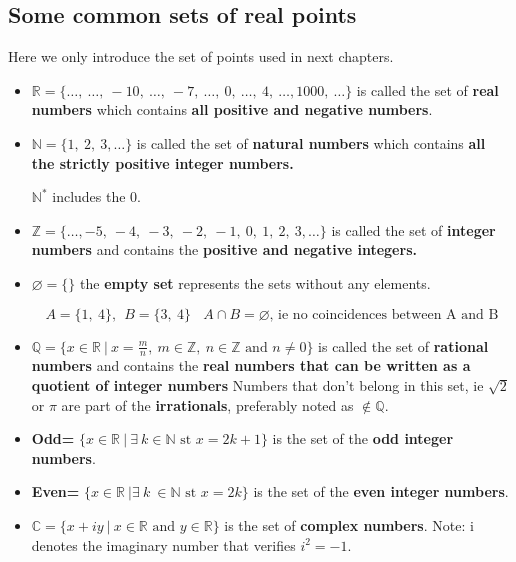 \documentclass[12pt, a4paper]{book}
\begin{document}
\subsection*{Some common sets of real points}
Here we only introduce the set of points used in next chapters.

\begin{defn}
\end{defn}
\boldmath
  \begin{itemize}
    \item $\mathbb{R}=\{ \ldots, \ \ldots, \ -10, \ \ldots, \ -7, \ \ldots, \ 0, \ \ldots, \ 4, \ \ldots, 1000, \ \ldots  \}$ is called the set of \textbf{real numbers} which contains \textbf{all positive and negative numbers}.
    \item $\mathbb{N}= \{1, \ 2 , \ 3 , \ldots \}$ is called the set of \textbf{natural numbers} which contains \textbf{all the strictly positive integer numbers.}
    \begin{rem}
      $\mathbb{N^{*}}$ includes the 0.
    \end{rem}
    \item $\mathbb{Z}= \{\ldots, -5, \ -4, \ -3, \ -2, \ -1, \ 0, \ 1, \ 2, \ 3, \ldots  \}$ is called the set of \textbf{integer numbers} and contains the \textbf{positive and negative integers.}
    \item $\varnothing = \{\}$ the \textbf{empty set} represents the sets without any elements. 
    \begin{exmp}
      \[
        A=\{1, \ 4 \}, \ \ B=\{3, \ 4 \} \ \ \ \ A \cap B= \varnothing \text{, ie no coincidences between A and B}
      \]
    \end{exmp} 
    \item $\mathbb{Q}= \{x \in \mathbb{R} \ \vert \ x= \frac{m}{n}, \ m \in \mathbb{Z}, \ n \in \mathbb{Z} \text{ and } n \neq 0 \}$ is called the set of \textbf{rational numbers} and contains the \textbf{real numbers that can be written as a quotient of integer numbers}
    Numbers that don't belong in this set, ie $\sqrt{2}$ or $\pi$ are part of the \textbf{irrationals}, preferably noted as $\notin \mathbb{Q}$.
    \item \textbf{Odd=} $\{ x \in \mathbb{R} \ \vert \ \exists \ k \in \mathbb{N} \text{ st } x=2k+1 \}$ is the set of the \textbf{odd integer numbers}.
    \item \textbf{Even=} $\{ x \in \mathbb{R} \ \vert \exists \ k \ \in \mathbb{N} \text{ st } x=2k \}$ is the set of the \textbf{even integer numbers}.
    \item $\mathbb{C}= \{x +iy \ \vert \ x \in \mathbb{R} \text{ and } y \in \mathbb{R}  \}$ is the set of \textbf{complex numbers}. Note: i denotes the imaginary number that verifies $i^2=-1$.
  \end{itemize}
  \unboldmath
\end{document}
